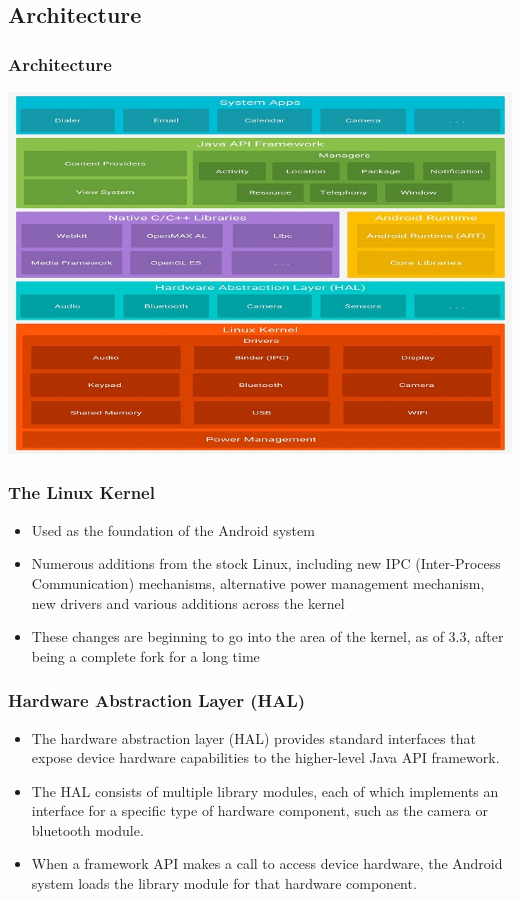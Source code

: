 \subsection{Architecture}
\begin{frame}
  \frametitle{Architecture}
  \begin{center}
    \includegraphics[width=\textwidth]{slides/android-introduction-architecture/architecture_1.jpg}
  \end{center}
\end{frame}

\begin{frame}
  \frametitle{The Linux Kernel}
  \begin{itemize}
  \item Used as the foundation of the Android system
  \item Numerous additions from the stock Linux, including new IPC (Inter-Process Communication) mechanisms,
    alternative power management mechanism, new drivers and various
    additions across the kernel
  \item These changes are beginning to go into the 
    area of the kernel, as of 3.3, after being a complete fork for a
    long time
  \end{itemize}
\end{frame}

\begin{frame}
  \frametitle{Hardware Abstraction Layer (HAL)}
  \begin{itemize}
  \item The hardware abstraction layer (HAL) provides standard interfaces that expose device hardware capabilities to the higher-level Java API framework.
  \item The HAL consists of multiple library modules, each of which implements an interface for a specific type of hardware component, such as the camera or bluetooth module.
  \item When a framework API makes a call to access device hardware, the Android system loads the library module for that hardware component.
  \end{itemize}
\end{frame}

